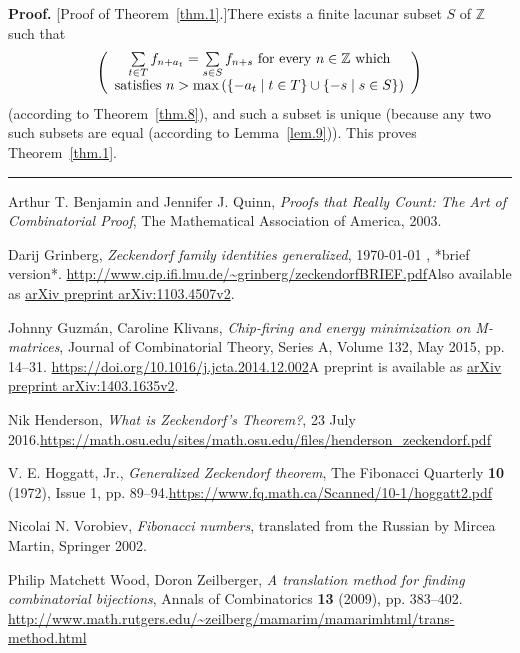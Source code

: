 \documentclass[numbers=enddot,12pt,final,onecolumn,notitlepage]{scrartcl}%
\numberwithin{exer}{section}
\theoremstyle{definition}
\newenvironment{proof}[1][Proof]{\noindent\textbf{#1.} }{\ \rule{0.5em}{0.5em}}
\let\sumnonlimits\sum
\renewcommand{\sum}{\sumnonlimits\limits}
\begin{document}
\begin{proof}
[Proof of Theorem~\ref{thm.1}.]There exists a finite lacunar subset $S$ of
$\mathbb{Z}$ such that
\[
\left(
\begin{array}
[c]{c}%
\sum\limits_{t\in T}f_{n+a_{t}}=\sum\limits_{s\in S}f_{n+s}\text{ for every
}n\in\mathbb{Z}\text{ which}\\
\text{satisfies }n>\max\left(  \left\{  -a_{t}\mid t\in T\right\}
\cup\left\{  -s\mid s\in S\right\}  \right)
\end{array}
\right)
\]
(according to Theorem~\ref{thm.8}), and such a subset is unique (because any
two such subsets are equal (according to Lemma~\ref{lem.9})). This proves
Theorem~\ref{thm.1}.
\end{proof}

\begin{thebibliography}{99999999}                                                                                         %


Arthur T. Benjamin and Jennifer J. Quinn,
\textit{Proofs that Really Count: The Art of Combinatorial Proof}, The
Mathematical Association of America, 2003.

Darij Grinberg, \textit{Zeckendorf family
identities generalized},
\today
, *brief version*.\newline%
\url{http://www.cip.ifi.lmu.de/~grinberg/zeckendorfBRIEF.pdf}\newline Also
available as \href{https://arxiv.org/abs/1103.4507v2}{arXiv preprint
arXiv:1103.4507v2}.

Johnny Guzm\'{a}n, Caroline Klivans,
\textit{Chip-firing and energy minimization on M-matrices}, Journal of
Combinatorial Theory, Series A, Volume 132, May 2015, pp. 14--31.\newline%
\url{https://doi.org/10.1016/j.jcta.2014.12.002}\newline A preprint is
available as \href{https://arxiv.org/abs/1403.1635v2}{arXiv preprint
arXiv:1403.1635v2}.

Nik Henderson, \textit{What is Zeckendorf's
Theorem?}, 23 July 2016.\newline\url{https://math.osu.edu/sites/math.osu.edu/files/henderson_zeckendorf.pdf}

V. E. Hoggatt, Jr., \textit{Generalized Zeckendorf
theorem}, The Fibonacci Quarterly \textbf{10} (1972), Issue 1, pp.
89--94.\newline\url{https://www.fq.math.ca/Scanned/10-1/hoggatt2.pdf}

Nicolai N. Vorobiev, \textit{Fibonacci numbers},
translated from the Russian by Mircea Martin, Springer 2002.

Philip Matchett Wood, Doron Zeilberger, \textit{A
translation method for finding combinatorial bijections}, Annals of
Combinatorics \textbf{13} (2009), pp. 383--402. \newline\url{http://www.math.rutgers.edu/~zeilberg/mamarim/mamarimhtml/trans-method.html}
\end{thebibliography}
\end{document}
